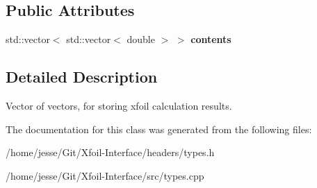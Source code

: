 \subsection*{Public Attributes}
\begin{DoxyCompactItemize}
\item 
\mbox{\label{classpolar_a1c55c9133a8862a41e91142d06c57a93}} 
std\+::vector$<$ std\+::vector$<$ double $>$ $>$ {\bfseries contents}
\end{DoxyCompactItemize}


\subsection{Detailed Description}
Vector of vectors, for storing xfoil calculation results. 

The documentation for this class was generated from the following files\+:\begin{DoxyCompactItemize}
\item 
/home/jesse/\+Git/\+Xfoil-\/\+Interface/headers/types.\+h\item 
/home/jesse/\+Git/\+Xfoil-\/\+Interface/src/types.\+cpp\end{DoxyCompactItemize}

